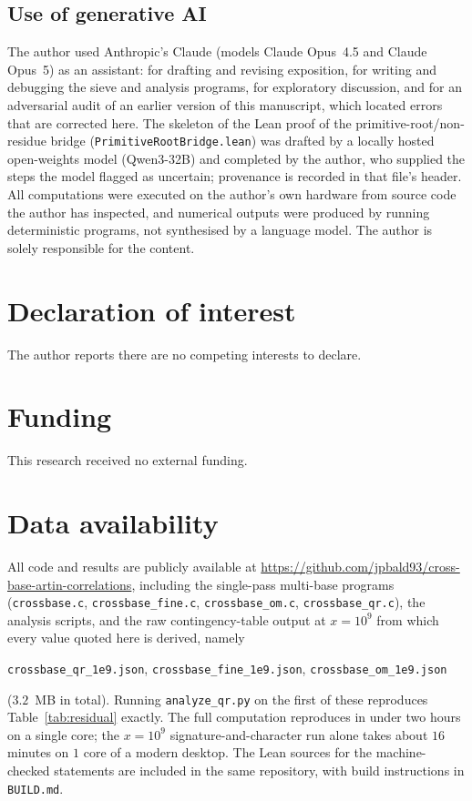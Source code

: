 \documentclass[11pt,reqno]{amsart}
\theoremstyle{plain}
\theoremstyle{definition}
\begin{document}
\subsection*{Use of generative AI}
The author used Anthropic's Claude (models Claude Opus~4.5 and Claude Opus~5)
as an assistant: for drafting and revising exposition, for writing and
debugging the sieve and analysis programs, for exploratory discussion, and for
an adversarial audit of an earlier version of this manuscript, which located
errors that are corrected here. The skeleton of the Lean proof of the
primitive-root/non-residue bridge (\texttt{PrimitiveRootBridge.lean}) was
drafted by a locally hosted open-weights model (Qwen3-32B) and completed by
the author, who supplied the steps the model flagged as uncertain; provenance
is recorded in that file's header. All computations were executed on the
author's own hardware from source code the author has inspected, and numerical
outputs were produced by running deterministic programs, not synthesised by a
language model. The author is solely responsible for the content.

\section*{Declaration of interest}
The author reports there are no competing interests to declare.

\section*{Funding}
This research received no external funding.

\section*{Data availability}
All code and results are publicly available at
\url{https://github.com/jpbald93/cross-base-artin-correlations}, including the
single-pass multi-base programs (\texttt{crossbase.c},
\texttt{crossbase\_fine.c}, \texttt{crossbase\_om.c},
\texttt{crossbase\_qr.c}), the analysis scripts, and the raw
contingency-table output at $x = 10^9$ from which every value quoted here is
derived, namely
\begin{center}
\texttt{crossbase\_qr\_1e9.json}, \quad
\texttt{crossbase\_fine\_1e9.json}, \quad
\texttt{crossbase\_om\_1e9.json}
\end{center}
($3.2$~MB in total). Running \texttt{analyze\_qr.py} on the first of these
reproduces Table~\ref{tab:residual} exactly. The full computation reproduces in under two
hours on a single core; the $x = 10^9$ signature-and-character run alone takes
about $16$ minutes on $1$ core of a modern desktop. The Lean sources for the
machine-checked statements are included in the same repository, with build
instructions in \texttt{BUILD.md}.
\end{document}
